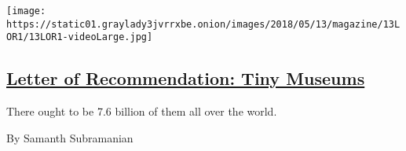 \begin{enumerate}
  \texttt{[image: https://static01.graylady3jvrrxbe.onion/images/2018/05/13/magazine/13LOR1/13LOR1-videoLarge.jpg]}

  \hypertarget{letter-of-recommendation-tiny-museums}{%
  \subsection{\texorpdfstring{\href{/2018/05/09/magazine/letter-of-recommendation-tiny-museums.html}{Letter
  of Recommendation: Tiny
  Museums}}{Letter of Recommendation: Tiny Museums}}\label{letter-of-recommendation-tiny-museums}}

  There ought to be 7.6 billion of them all over the world.

  By Samanth Subramanian
\end{enumerate}


